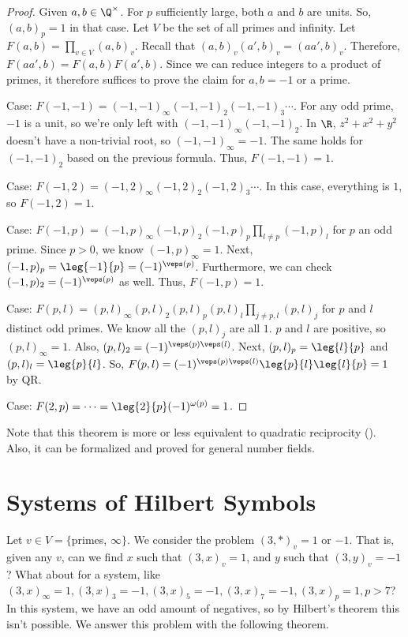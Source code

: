\begin{proof}
    Given $a,b \in \Q^\times$. For $p$ sufficiently large, both $a$ and $b$ are units. So, $(a,b)_p=1$ in that case. Let $V$ be the set of all primes and infinity. Let $F(a,b) = \prod _{v \in V} (a,b)_v$. Recall that $(a,b)_v(a',b)_v=(aa',b)_v$. Therefore, $F(aa',b)=F(a,b)F(a',b)$. Since we can reduce integers to a product of primes, it therefore suffices to prove the claim for $a,b = -1$ or a prime.

    Case: $F(-1,-1)=(-1,-1)_\infty(-1,-1)_2(-1,-1)_3\cdots$. For any odd prime, $-1$ is a unit, so we're only left with $(-1,-1)_\infty(-1,-1)_2$. In $\R$, $z^2+x^2+y^2$ doesn't have a non-trivial root, so $(-1,-1)_\infty =-1$. The same holds for $(-1,-1)_2$ based on the previous formula. Thus, $F(-1,-1)=1$.

    Case: $F(-1,2)=(-1,2)_\infty(-1,2)_2(-1,2)_3\cdots $. In this case, everything is $1$, so $F(-1,2)=1$.

    Case: $F(-1,p)=(-1,p)_\infty (-1,p)_2(-1,p)_p\prod_{l \neq p}(-1,p)_{l}$ for $p$ an odd prime. Since $p>0$, we know $(-1,p)_\infty =1$. Next, $(-1,p)_p = \leg{-1}{p}=(-1)^{\veps (p)}$. Furthermore, we can check $(-1,p)_2 = (-1)^{\veps (p)}$ as well. Thus, $F(-1,p)=1$.

    Case: $F(p,l)=(p,l)_\infty(p,l)_2(p,l)_p(p,l)_l \prod_{j\neq p,l}(p,l)_j$ for $p$ and $l$ distinct odd primes. We know all the $(p,l)_j$ are all $1$. $p$ and $l$ are positive, so $(p,l)_\infty =1$. Also, $(p,l)_2=(-1)^{\veps (p) \veps (l)}$. Next, $(p,l)_p = \leg{l}{p}$ and $(p,l)_l = \leg{p}{l}$. So, $F(p,l) = (-1)^{\veps (p)\veps (l)}\leg{p}{l}\leg{l}{p}=1$ by QR.

    Case: $F(2,p) = \cdots = \leg{2}{p}(-1)^{\omega (p)}=1$.
\end{proof}

Note that this theorem is more or less equivalent to quadratic reciprocity (). Also, it can be formalized and proved for general number fields.

\section{Systems of Hilbert Symbols}

\begin{ex}
    Let $v \in V=\{$primes, $\infty \}$. We consider the problem $(3,*)_v = 1$ or $-1$. That is, given any $v$, can we find $x$ such that $(3,x)_v=1$, and $y$ such that $(3,y)_v=-1$? What about for a system, like $(3,x)_\infty=1,(3,x)_3=-1,(3,x)_5=-1,(3,x)_7=-1,(3,x)_p=1,p>7$? In this system, we have an odd amount of negatives, so by Hilbert's theorem this isn't possible. We answer this problem with the following theorem.
\end{ex}

